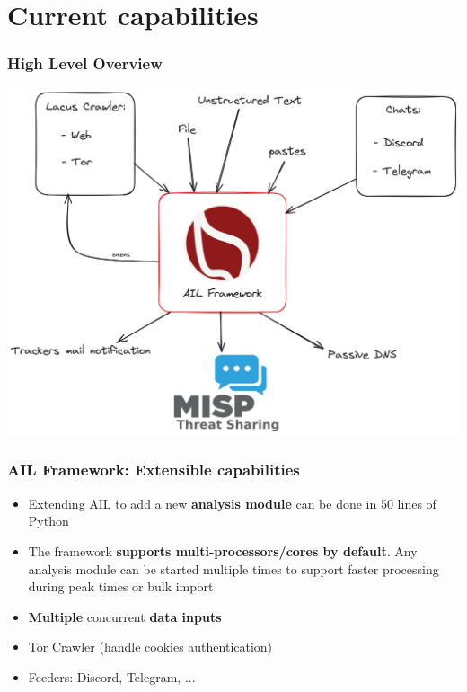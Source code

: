 \documentclass[10pt,aspectratio=169, colorlinks=true, linkcolor=circlBlue]{beamer}
\begin{document}
\section{Current capabilities}

\begin{frame}
    \frametitle{High Level Overview}
    \begin{center}
        \includegraphics[scale=0.22]{images/ail-overview.png}
    \end{center}
\end{frame}


\begin{frame}
    \frametitle{AIL Framework: Extensible capabilities}
    \begin{itemize}
        \item Extending AIL to add a new {\bf analysis module} can be done in 50 lines of Python
        \item The framework {\bf supports multi-processors/cores by default}. Any analysis module can be started multiple times to support faster processing during peak times or bulk import
        \item \textbf{Multiple} concurrent \textbf{data inputs}
        \item Tor Crawler (handle cookies authentication)
        \item Feeders: Discord, Telegram, ...
    \end{itemize}
\end{frame}
\end{document}
